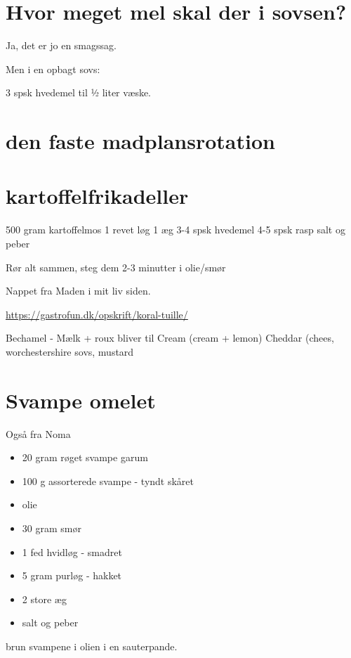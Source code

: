 \documentclass[
]{book}
\providecommand{\tightlist}{%
  \setlength{\itemsep}{0pt}\setlength{\parskip}{0pt}}
\begin{document}
\section{Hvor meget mel skal der i sovsen?}\label{hvor-meget-mel-skal-der-i-sovsen}

Ja, det er jo en smagssag.

Men i en opbagt sovs:

3 spsk hvedemel til ½ liter væske.

\section{den faste madplansrotation}\label{den-faste-madplansrotation}

\section{kartoffelfrikadeller}\label{kartoffelfrikadeller}

500 gram kartoffelmos
1 revet løg
1 æg
3-4 spsk hvedemel
4-5 spsk rasp
salt og peber

Rør alt sammen, steg dem 2-3 minutter i olie/smør

Nappet fra Maden i mit liv siden.

\url{https://gastrofun.dk/opskrift/koral-tuille/}

Bechamel - Mælk + roux
bliver til
Cream (cream + lemon)
Cheddar (chees, worchestershire sovs, mustard

\section{Svampe omelet}\label{svampe-omelet}

Også fra Noma

\begin{itemize}
\tightlist
\item
  20 gram røget svampe garum
\item
  100 g assorterede svampe - tyndt skåret
\item
  olie
\item
  30 gram smør
\item
  1 fed hvidløg - smadret
\item
  5 gram purløg - hakket
\item
  2 store æg
\item
  salt og peber
\end{itemize}

brun svampene i olien i en sauterpande.
\end{document}
